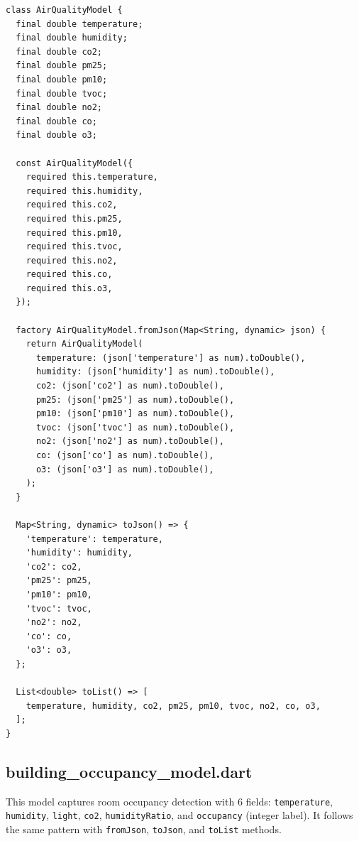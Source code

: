 \documentclass[12pt,a4paper,oneside]{report}
\newcommand{\code}[1]{\texttt{#1}}
\begin{document}
\begin{lstlisting}[style=dartstyle]
class AirQualityModel {
  final double temperature;
  final double humidity;
  final double co2;
  final double pm25;
  final double pm10;
  final double tvoc;
  final double no2;
  final double co;
  final double o3;

  const AirQualityModel({
    required this.temperature,
    required this.humidity,
    required this.co2,
    required this.pm25,
    required this.pm10,
    required this.tvoc,
    required this.no2,
    required this.co,
    required this.o3,
  });

  factory AirQualityModel.fromJson(Map<String, dynamic> json) {
    return AirQualityModel(
      temperature: (json['temperature'] as num).toDouble(),
      humidity: (json['humidity'] as num).toDouble(),
      co2: (json['co2'] as num).toDouble(),
      pm25: (json['pm25'] as num).toDouble(),
      pm10: (json['pm10'] as num).toDouble(),
      tvoc: (json['tvoc'] as num).toDouble(),
      no2: (json['no2'] as num).toDouble(),
      co: (json['co'] as num).toDouble(),
      o3: (json['o3'] as num).toDouble(),
    );
  }

  Map<String, dynamic> toJson() => {
    'temperature': temperature,
    'humidity': humidity,
    'co2': co2,
    'pm25': pm25,
    'pm10': pm10,
    'tvoc': tvoc,
    'no2': no2,
    'co': co,
    'o3': o3,
  };

  List<double> toList() => [
    temperature, humidity, co2, pm25, pm10, tvoc, no2, co, o3,
  ];
}
\end{lstlisting}

\subsection{building\_occupancy\_model.dart}

This model captures room occupancy detection with 6 fields: \code{temperature}, \code{humidity}, \code{light}, \code{co2}, \code{humidityRatio}, and \code{occupancy} (integer label). It follows the same pattern with \code{fromJson}, \code{toJson}, and \code{toList} methods.
\end{document}
